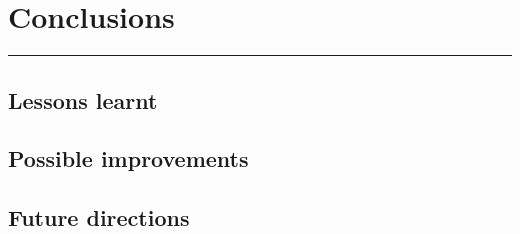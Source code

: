 \chapter{Conclusions}\label{ch:conclusion}

\vspace{-1.5 em}
\begin{addmargin}[-0.5cm]{0cm}
  \minitoc
\end{addmargin}
\hrule
\vspace{1.5 em}

\section{Lessons learnt}
\section{Possible improvements}
\section{Future directions}